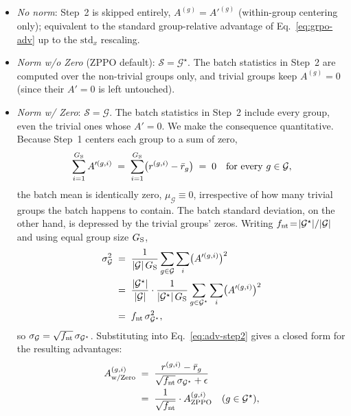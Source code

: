 \begin{itemize}[leftmargin=12pt,topsep=2pt,itemsep=2pt]
  \item \emph{No norm}: Step~2 is skipped entirely, $A^{(g)}\!=\!A'^{(g)}$ (within-group centering only); equivalent to the standard group-relative advantage of Eq.~\eqref{eq:grpo-adv} up to the $\mathrm{std}_x$ rescaling.
  \item \emph{Norm w/o Zero} (ZPPO default): $\mathcal{S}\!=\!\mathcal{G}^{\star}$. The batch statistics in Step~2 are computed over the non-trivial groups only, and trivial groups keep $A^{(g)}\!=\!0$ (since their $A'\!=\!0$ is left untouched).
  \item \emph{Norm w/ Zero}: $\mathcal{S}\!=\!\mathcal{G}$. The batch statistics in Step~2 include every group, even the trivial ones whose $A'\!=\!0$. We make the consequence quantitative. Because Step~1 centers each group to a sum of zero,
  \begin{equation}
  \sum_{i=1}^{G_{\rm S}} A'^{(g,i)} \;=\; \sum_{i=1}^{G_{\rm S}} \bigl(r^{(g,i)}-\bar{r}_g\bigr) \;=\; 0 \quad \text{for every } g\in\mathcal{G},
  \label{eq:groupsum-zero}
  \end{equation}
  the batch mean is identically zero, $\mu_{\mathcal{G}}\!\equiv\!0$, irrespective of how many trivial groups the batch happens to contain. The batch standard deviation, on the other hand, is depressed by the trivial groups' zeros. Writing $f_{\rm nt}\!=\!|\mathcal{G}^{\star}|/|\mathcal{G}|$ and using equal group size $G_{\rm S}$,
  \begin{align}
  \sigma_{\mathcal{G}}^{2}
    &\;=\; \frac{1}{|\mathcal{G}|\,G_{\rm S}} \sum_{g\in\mathcal{G}}\sum_{i} \bigl(A'^{(g,i)}\bigr)^{2} \nonumber \\
    &\;=\; \frac{|\mathcal{G}^{\star}|}{|\mathcal{G}|}\cdot\frac{1}{|\mathcal{G}^{\star}|\,G_{\rm S}}\sum_{g\in\mathcal{G}^{\star}}\sum_{i} \bigl(A'^{(g,i)}\bigr)^{2} \nonumber \\
    &\;=\; f_{\rm nt}\,\sigma_{\mathcal{G}^{\star}}^{2},
  \label{eq:sigma-shrink}
  \end{align}
  so $\sigma_{\mathcal{G}}=\sqrt{f_{\rm nt}}\,\sigma_{\mathcal{G}^{\star}}$. Substituting into Eq.~\eqref{eq:adv-step2} gives a closed form for the resulting advantages:
  \begin{align}
  A^{(g,i)}_{\text{w/Zero}}
    &\;=\; \frac{r^{(g,i)}-\bar{r}_g}{\sqrt{f_{\rm nt}}\,\sigma_{\mathcal{G}^{\star}}+\epsilon} \nonumber \\
    &\;=\; \frac{1}{\sqrt{f_{\rm nt}}}\cdot A^{(g,i)}_{\text{ZPPO}} \quad (g\in\mathcal{G}^{\star}), \nonumber \\

\end{align}
\end{itemize}

